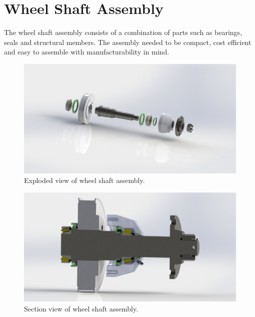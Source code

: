 \section{Wheel Shaft Assembly}\label{sec:wheel_shaft_assembly}
The wheel shaft assembly consists of a combination of parts such as bearings, seals and structural members. The assembly needed to be compact, cost efficient and easy to assemble with manufacturability in mind. %

\begin{figure}[h]\centering
	\includegraphics[width=.7\linewidth]{images/explode_wheel_assembly.jpg}
	\caption{Exploded view of wheel shaft assembly.}
	\label{fig:wheel_explode}
\end{figure}

\begin{figure}[h]\centering
	\includegraphics[width=.7\linewidth]{images/wheel_shaft_section.jpg}
	\caption{Section view of wheel shaft assembly.}
	\label{fig:wheel_section}
\end{figure}

